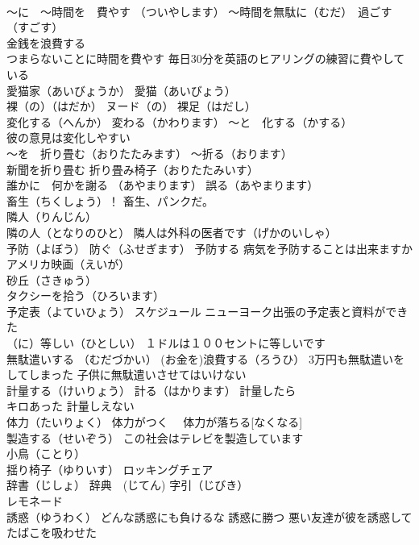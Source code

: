 \documentclass[8pt]{extreport}
\begin{document}
\begin{CJK}{UTF8}{min}
\\	～に　～時間を　費やす （ついやします） ～時間を無駄に（むだ）　過ごす（すごす）
\\	金銭を浪費する　
\\	つまらないことに時間を費やす 毎日30分を英語のヒアリングの練習に費やしている
\\	愛猫家（あいびょうか） 愛猫（あいびょう）
\\	裸（の）（はだか） ヌード（の） 裸足（はだし）
\\	変化する（へんか） 変わる（かわります） ～と　化する（かする）
\\	彼の意見は変化しやすい
\\	～を　折り畳む（おりたたみます） ～折る（おります）
\\	新聞を折り畳む 折り畳み椅子（おりたたみいす）
\\	誰かに　何かを謝る （あやまります） 誤る（あやまります） 
\\	畜生（ちくしょう）！ 畜生、パンクだ。
\\	隣人（りんじん）
\\	隣の人（となりのひと） 隣人は外科の医者です（げかのいしゃ）
\\	予防（よぼう） 防ぐ（ふせぎます） 予防する 病気を予防することは出来ますか
\\	アメリカ映画（えいが）
\\	砂丘（さきゅう）
\\	タクシーを拾う（ひろいます）
\\	予定表（よていひょう） スケジュール ニューヨーク出張の予定表と資料ができた
\\	（に）等しい（ひとしい） １ドルは１００セントに等しいです
\\	無駄遣いする （むだづかい） (お金を)浪費する（ろうひ） 3万円も無駄遣いをしてしまった 子供に無駄遣いさせてはいけない
\\	計量する（けいりょう） 計る（はかります） 計量したら 
\\	キロあった 計量しえない
\\	体力（たいりょく） 体力がつく　 体力が落ちる[なくなる]
\\	製造する（せいぞう） この社会はテレビを製造しています
\\	小鳥（ことり）
\\	揺り椅子（ゆりいす） ロッキングチェア
\\	辞書（じしょ） 辞典　(じてん) 字引（じびき）
\\	レモネード
\\	誘惑（ゆうわく） どんな誘惑にも負けるな 誘惑に勝つ 悪い友達が彼を誘惑してたばこを吸わせた

\end{CJK}
\end{document}
